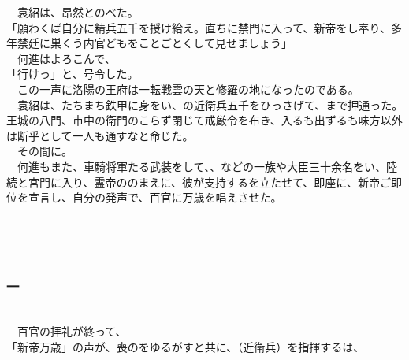 \documentclass[
  paper=a5,
  fontsize=10pt,
  jafontsize=9.5pt,
  tate,                  %
  open_bracket_pos=nibu, %
]{jlreq}
\begin{document}
　袁紹は、昂然とのべた。\\


「願わくば自分に精兵五千を授け給え。直ちに禁門に入って、新帝をし奉り、多年禁廷に巣くう内官どもをことごとくして見せましょう」\\


　何進はよろこんで、\\


「行けっ」と、号令した。\\


　この一声に洛陽の王府は一転戦雲の天と修羅の地になったのである。\\


　袁紹は、たちまち鉄甲に身をい、の近衛兵五千をひっさげて、まで押通った。王城の八門、市中の衛門のこらず閉じて戒厳令を布き、入るも出ずるも味方以外は断乎として一人も通すなと命じた。\\


　その間に。\\


　何進もまた、車騎将軍たる武装をして、、などの一族や大臣三十余名をい、陸続と宮門に入り、霊帝ののまえに、彼が支持するを立たせて、即座に、新帝ご即位を宣言し、自分の発声で、百官に万歳を唱えさせた。\\

\\

\subsection{}

\\

\subsubsection{一}

\\


　百官の拝礼が終って、\\


「新帝万歳」の声が、喪のをゆるがすと共に、（近衛兵）を指揮するは、\\
\end{document}
